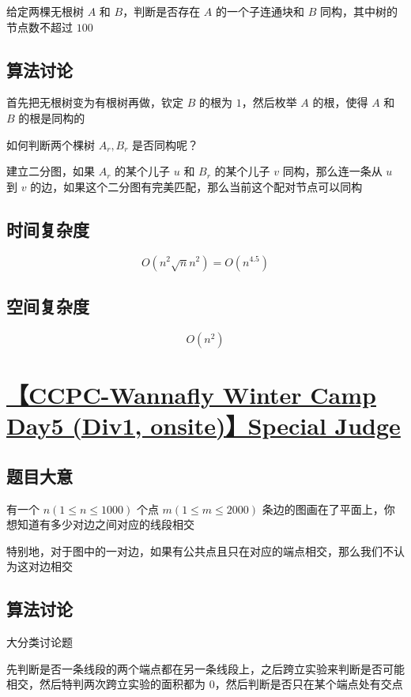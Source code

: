 \documentclass[UTF8]{article}
\begin{document}
给定两棵无根树 $A$ 和 $B$，判断是否存在 $A$ 的一个子连通块和 $B$ 同构，其中树的节点数不超过 $100$

\subsection{算法讨论}

首先把无根树变为有根树再做，钦定 $B$ 的根为 $1$，然后枚举 $A$ 的根，使得 $A$ 和 $B$ 的根是同构的

如何判断两个棵树 $A_r,B_r$ 是否同构呢？

建立二分图，如果 $A_r$ 的某个儿子 $u$ 和 $B_r$ 的某个儿子 $v$ 同构，那么连一条从 $u$ 到 $v$ 的边，如果这个二分图有完美匹配，那么当前这个配对节点可以同构

\subsection{时间复杂度}

$$
O(n^2 \sqrt{n} n^2)=O(n^{4.5})
$$

\subsection{空间复杂度}

$$
O(n^2)
$$

\section{\href{https://www.zhixincode.com/contest/20/problem/J?problem_id=305}{【CCPC-Wannafly Winter Camp Day5 (Div1, onsite)】Special Judge}}

\subsection{题目大意}

有一个 $n(1 \le n \le 1000)$ 个点 $m(1 \le m \le 2000)$ 条边的图画在了平面上，你想知道有多少对边之间对应的线段相交

特别地，对于图中的一对边，如果有公共点且只在对应的端点相交，那么我们不认为这对边相交

\subsection{算法讨论}

大分类讨论题

先判断是否一条线段的两个端点都在另一条线段上，之后跨立实验来判断是否可能相交，然后特判两次跨立实验的面积都为 $0$，然后判断是否只在某个端点处有交点
\end{document}
